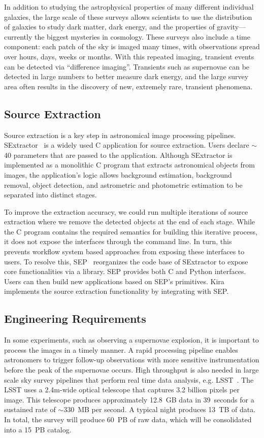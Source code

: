\documentclass[10pt, conference, compsocconf]{IEEEtran}
\begin{document}
In addition to studying the astrophysical properties of many different individual galaxies,
the large scale of these surveys allows scientists to use the distribution of galaxies to
study dark matter, dark energy, and the properties of gravity---currently the
biggest mysteries in cosmology. These surveys also include a time component: each patch of the sky is imaged many times,
with observations spread over hours, days, weeks or months. With this repeated imaging,
transient events can be detected via ``difference imaging''. Transients such as supernovae
can be detected in large numbers to better measure dark energy, and the large survey area
often results in the discovery of new, extremely rare, transient phenomena.

\subsection{Source Extraction}

Source extraction is a key step in astronomical image processing pipelines.
SExtractor~\cite{bertin96} is a widely used C application for source extraction.
Users declare $\sim$40 parameters that are passed to the application. Although
SExtractor is implemented as a monolithic C program that extracts astronomical
objects from images, the application's logic allows background estimation,
background removal, object detection, and astrometric and photometric estimation
to be separated into distinct stages.

To improve the extraction accuracy, we could run multiple iterations of source
extraction where we remove the detected objects at the end of each stage. While
the C program contains the required semantics for building this iterative process,
it does not expose the interfaces through the command line. In turn, this prevents
workflow system based approaches from exposing these interfaces to users. To resolve this,
SEP~\cite{barbary2015} reorganizes the code base of SExtractor to expose core
functionalities via a library. SEP provides both C and Python interfaces. Users can then
build new applications based on SEP's primitives. Kira implements the source extraction
functionality by integrating with SEP.

\subsection{Engineering Requirements}
\label{sec:Background-EngReq}

In some experiments, such as observing a supernovae explosion, it is important to process
the images in a timely manner. A rapid processing pipeline enables astronomers to trigger follow-up
observations with more sensitive instrumentation before the peak of the supernovae occurs.
High throughput is also needed in large scale
sky survey pipelines that perform real time data analysis, e.g. LSST~\cite{ivezic08}.
The LSST uses a 2.4m-wide optical telescope that captures 3.2 billion pixels per
image. This telescope produces approximately 12.8~GB data in 39~seconds
for a sustained rate of $\sim$330~MB per second. A typical night produces 13~TB of data. In
total, the survey will produce 60~PB of raw data, which will be consolidated into a 15~PB catalog.
\end{document}
